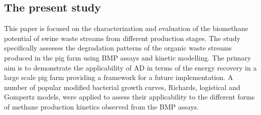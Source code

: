 \subsection{The present study}
This paper is focused on the characterization and evaluation of the biomethane potential of swine waste streams from different production stages. The study specifically assesses the degradation patterns of the organic waste streams produced in the pig farm using BMP assays and kinetic modelling. The primary aim is to demonstrate the applicability of AD in terms of the energy recovery in a large scale pig farm providing a framework for a future implementation. A number of popular modified bacterial growth curves, Richards, logistical and Gompertz models, were applied to assess their applicability to the different forms of methane production kinetics observed from the BMP assays.